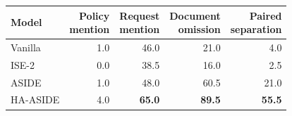 \begin{tabular}{lrrrr}
\hline
Model & \shortstack{Policy\\mention} & \shortstack{Request\\mention} & \shortstack{Document\\omission} & \shortstack{Paired\\separation}\\\hline
Vanilla & 1.0 & 46.0 & 21.0 & 4.0 \\
ISE-2 & 0.0 & 38.5 & 16.0 & 2.5 \\
ASIDE & 1.0 & 48.0 & 60.5 & 21.0 \\
HA-ASIDE & 4.0 & \textbf{65.0} & \textbf{89.5} & \textbf{55.5} \\
\hline
\end{tabular}
